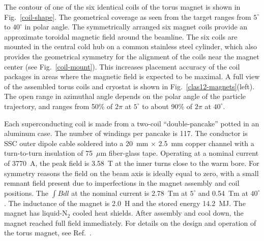 \documentclass[final,3p,twocolumn]{elsarticle}
\begin{document}
The contour of one of the six identical coils of the torus magnet is shown in Fig.~\ref{coil-shape}. The geometrical
coverage as seen from the target ranges from $5^\circ$ to $40^\circ$ in polar angle. The symmetrically arranged six
magnet coils provide an approximate toroidal magnetic field around the beamline. The six coils are mounted in the
central cold hub on a common stainless steel cylinder, which also provides the geometrical symmetry for the alignment
of the coils near the magnet center (see Fig.~\ref{coil-mount}). This increases placement accuracy of the coil
packages in areas where the magnetic field is expected to be maximal. A full view of the assembled torus coils and
cryostat is shown in Fig.~\ref{clas12-magnets}(left). The open range in azimuthal angle depends on the polar angle
of the particle trajectory, and ranges from 50\% of $2\pi$ at $5^\circ$ to about 90\% of $2\pi$ at $40^\circ$.

Each superconducting coil is made from a two-coil ``double-pancake'' potted in an aluminum case. The number of
windings per pancake is 117. The conductor is SSC outer dipole cable soldered into a 20~mm $\times$ 2.5~mm
copper channel with a turn-to-turn insulation of 75~$\mu$m fiber-glass tape. Operating at a nominal current of
3770~A, the peak field is 3.58~T at the inner turns close to the warm bore. For symmetry reasons the field on
the beam axis is ideally equal to zero, with a small remnant field present due to imperfections in the magnet
assembly and coil positions. The $\int {Bdl}$ at the nominal current is 2.78~Tm at $5^\circ$ and 0.54~Tm at
$40^\circ$. The inductance of the magnet is 2.0~H and the stored energy 14.2~MJ. The magnet has liquid-N$_2$
cooled heat shields. After assembly and cool down, the magnet reached full field immediately. For details on the
design and operation of the torus magnet, see Ref.~\cite{clas12-magnets}.
\end{document}
